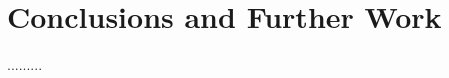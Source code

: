 \documentclass{llncs}
\begin{document}
\section{Conclusions and Further Work}
.........







\end{document}
